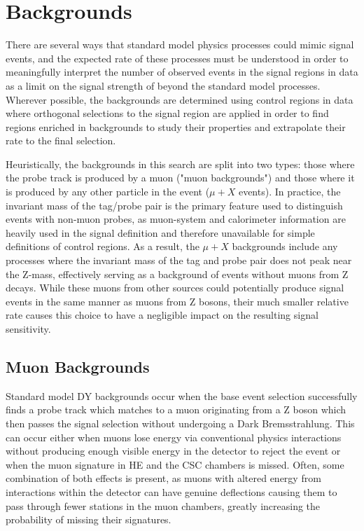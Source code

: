 \chapter{Backgrounds}
\label{backgrounds}
There are several ways that standard model physics processes could mimic signal events, and the expected rate of these processes must be understood in order to meaningfully interpret the number of observed events in the signal regions in data as a limit on the signal strength of beyond the standard model processes.
Wherever possible, the backgrounds are determined using control regions in data where orthogonal selections to the signal region are applied in order to find regions enriched in backgrounds to study their properties and extrapolate their rate to the final selection.

Heuristically, the backgrounds in this search are split into two types: those where the probe track is produced by a muon ("muon backgrounds") and those where it is produced by any other particle in the event ($\mu+X$ events).
In practice, the invariant mass of the tag/probe pair is the primary feature used to distinguish events with non-muon probes, as muon-system and calorimeter information are heavily used in the signal definition and therefore unavailable for simple definitions of control regions.
As a result, the $\mu+X$ backgrounds include any processes where the invariant mass of the tag and probe pair does not peak near the Z-mass, effectively serving as a background of events without muons from Z decays.
While these muons from other sources could potentially produce signal events in the same manner as muons from Z bosons, their much smaller relative rate causes this choice to have a negligible impact on the resulting signal sensitivity.

\section{Muon Backgrounds}
Standard model DY backgrounds occur when the base event selection successfully finds a probe track which matches to a muon originating from a Z boson which then passes the signal selection without undergoing a Dark Bremsstrahlung. 
This can occur either when muons lose energy via conventional physics interactions without producing enough visible energy in the detector to reject the event or when the muon signature in HE and the CSC chambers is missed.
Often, some combination of both effects is present, as muons with altered energy from interactions within the detector can have genuine deflections causing them to pass through fewer stations in the muon chambers, greatly increasing the probability of missing their signatures.


